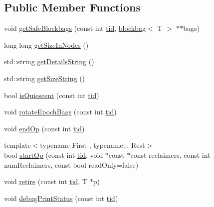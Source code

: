 \subsection*{Public Member Functions}
\begin{DoxyCompactItemize}
\item 
void \hyperlink{classreclaimer__ebr__tree_a3c1034e327a3b2136b4fd7212d701ff7}{get\+Safe\+Blockbags} (const int \hyperlink{microbench_2main_8cpp_a9ca9869868fe7e7a38a921cc7de4103f}{tid}, \hyperlink{classblockbag}{blockbag}$<$ T $>$ $\ast$$\ast$bags)
\item 
long long \hyperlink{classreclaimer__ebr__tree_aa8028a1222c839193450c18e67de9054}{get\+Size\+In\+Nodes} ()
\item 
std\+::string \hyperlink{classreclaimer__ebr__tree_a8e199d1bf0d466f1317f7d637a6c427f}{get\+Details\+String} ()
\item 
std\+::string \hyperlink{classreclaimer__ebr__tree_a36c7cdb0fc910954e2854d099577578d}{get\+Size\+String} ()
\item 
bool \hyperlink{classreclaimer__ebr__tree_ad738d298fd4c156af87eaa52e8b67911}{is\+Quiescent} (const int \hyperlink{microbench_2main_8cpp_a9ca9869868fe7e7a38a921cc7de4103f}{tid})
\item 
void \hyperlink{classreclaimer__ebr__tree_ad9653eeebe33675cae7f754026296e49}{rotate\+Epoch\+Bags} (const int \hyperlink{microbench_2main_8cpp_a9ca9869868fe7e7a38a921cc7de4103f}{tid})
\item 
void \hyperlink{classreclaimer__ebr__tree_abba75a9a4c5b57f3865dab1b7a79a873}{end\+Op} (const int \hyperlink{microbench_2main_8cpp_a9ca9869868fe7e7a38a921cc7de4103f}{tid})
\item 
{\footnotesize template$<$typename First , typename... Rest$>$ }\\bool \hyperlink{classreclaimer__ebr__tree_a3f049dc3decd80d6b2e22cc0af668efa}{start\+Op} (const int \hyperlink{microbench_2main_8cpp_a9ca9869868fe7e7a38a921cc7de4103f}{tid}, void $\ast$const $\ast$const reclaimers, const int num\+Reclaimers, const bool read\+Only=false)
\item 
void \hyperlink{classreclaimer__ebr__tree_ab47468d3259fb52ff889134d66070eb4}{retire} (const int \hyperlink{microbench_2main_8cpp_a9ca9869868fe7e7a38a921cc7de4103f}{tid}, T $\ast$p)
\item 
void \hyperlink{classreclaimer__ebr__tree_ab1987de4ed6253f4ff15790660791c44}{debug\+Print\+Status} (const int \hyperlink{microbench_2main_8cpp_a9ca9869868fe7e7a38a921cc7de4103f}{tid})
\item 
$$
\end{DoxyCompactItemize}
